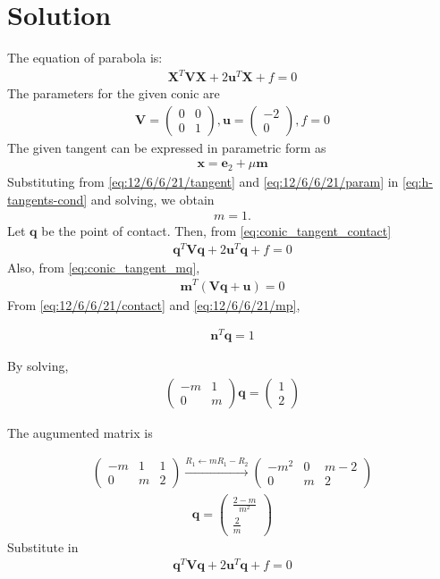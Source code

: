 \documentclass[10pt, a4paper]{article}
\newcommand{\myvec}[1]{\ensuremath{\begin{pmatrix}#1\end{pmatrix}}}
\let\vec\mathbf
\begin{document}
\section{Solution}
The equation of parabola is:
\begin{align}
    \vec{X}^T\vec{V}\vec{X} + 2\vec{u}^T\vec{X} + f = 0
\end{align}
\fi
The parameters for the given conic are
\begin{align}
    \vec{V} = \myvec{0&0\\0&1}, \vec{u} = \myvec{-2\\0}, f = 0
		\label{eq:12/6/6/21/param}
\end{align}
The given tangent can be expressed in parametric form as
\begin{align}
		\label{eq:12/6/6/21/tangent}
\vec{x} = \vec{e}_2 + \mu\vec{m}
\end{align}
Substituting from 
		\eqref{eq:12/6/6/21/tangent}
		and
		\eqref{eq:12/6/6/21/param}
		in 
	  \eqref{eq:h-tangents-cond}
and solving, we obtain 
\begin{align}
	m = 1.
\end{align}
\iffalse
Let $\vec{q}$ be the point of contact.   Then, from 
  \eqref{eq:conic_tangent_contact}
\begin{align}
\vec{q}^T\vec{V}\vec{q} + 2\vec{u}^T\vec{q} + f = 0
		\label{eq:12/6/6/21/contact}
\end{align}
Also, from 
  \eqref{eq:conic_tangent_mq},
\begin{align}
    \vec{m}^T(\vec{V}\vec{q}+\vec{u})=0
		\label{eq:12/6/6/21/mp}
\end{align}
From 
		\eqref{eq:12/6/6/21/contact}
		and 
		\eqref{eq:12/6/6/21/mp},


\begin{align}
        \vec{n}^T\vec{q} = 1
\end{align}

By solving,
\begin{align}
        \myvec{-m & 1 \\ 0 & m}\vec{q} = \myvec{1 \\ 2}
\end{align}

The augumented matrix is

\begin{align}
        \myvec{-m & 1 & 1 \\ 0 & m & 2}\xrightarrow[]{R_1 \leftarrow  mR_1 - R_2 } \myvec{-m^2 & 0 & m-2 \\ 0 & m & 2}
\end{align}
\begin{align}
        \vec{q} = \myvec{\frac{2 - m}{m^2} \\ \frac{2}{m}}
\end{align}
Substitute in
\begin{align}
        \vec{q}^T\vec{V}\vec{q} + 2\vec{u}^T\vec{q} + f = 0
\end{align}
\end{document}
